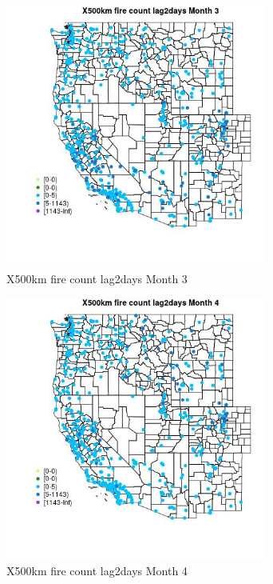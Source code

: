 \begin{figure} 
\centering  
\includegraphics[width=0.77\textwidth]{Code_Outputs/Report_ML_input_PM25_Step4_part_e_de_duplicated_aves_compiled_2019-05-14wNAs_MapObsMo3X500km_fire_count_lag2days.jpg} 
\caption{\label{fig:Report_ML_input_PM25_Step4_part_e_de_duplicated_aves_compiled_2019-05-14wNAsMapObsMo3X500km_fire_count_lag2days}X500km fire count lag2days Month 3} 
\end{figure} 
 

\clearpage 

\begin{figure} 
\centering  
\includegraphics[width=0.77\textwidth]{Code_Outputs/Report_ML_input_PM25_Step4_part_e_de_duplicated_aves_compiled_2019-05-14wNAs_MapObsMo4X500km_fire_count_lag2days.jpg} 
\caption{\label{fig:Report_ML_input_PM25_Step4_part_e_de_duplicated_aves_compiled_2019-05-14wNAsMapObsMo4X500km_fire_count_lag2days}X500km fire count lag2days Month 4} 
\end{figure} 
 

